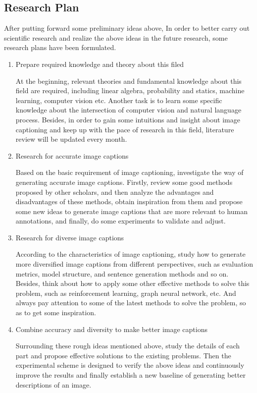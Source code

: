 \documentclass[12pt]{article}
\begin{document}
	\subsection{Research Plan}
	After putting forward some preliminary ideas above, In order to better carry out scientific research and realize the above ideas in the future research, some research plans have been formulated.
	\renewcommand{\labelenumi}{\Roman{enumi}}
	\begin{enumerate}
		\item Prepare required knowledge and theory about this filed  \par
			At the beginning, relevant theories and fundamental knowledge about this field are required, including linear algebra, probability and statics, machine learning, computer vision etc. Another task is to learn some specific knowledge about the intersection of computer vision and natural language process. Besides, in order to gain some intuitions and insight about image captioning and keep up with the pace of research in this field, literature review will be updated every month.
		\item Research for accurate image captions  \par
			Based on the basic requirement of image captioning, investigate the way of generating accurate image captions. Firstly, review some good methods proposed by other scholars, and then analyze the advantages and disadvantages of these methods, obtain inspiration from them and propose some new ideas to generate image captions that are more relevant to human annotations, and finally, do some experiments to validate and adjust.
		\item Research for diverse image captions \par
			According to the characteristics of image captioning, study how to generate more diversified image captions from different perspectives, such as evaluation metrics, model structure, and sentence generation methods and so on. Besides, think about how to apply some other effective methods to solve this problem, such as reinforcement learning, graph neural network, etc. And always pay attention to some of the latest methods to solve the problem, so as to get some inspiration.
		\item Combine accuracy and diversity to make better image captions \par
			Surrounding these rough ideas mentioned above, study the details of each part and propose effective solutions to the existing problems. Then the experimental scheme is designed to verify the above ideas and continuously improve the results and finally establish a new baseline of generating better descriptions of an image.
	\end{enumerate}
	 
\end{document}
